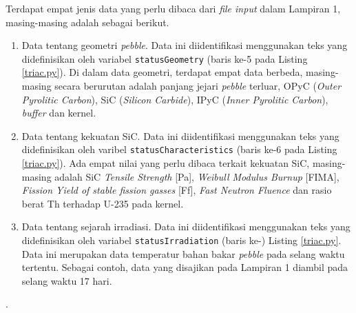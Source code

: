 \documentclass[a4paper,11pt]{report}
\begin{document}
Terdapat empat jenis data yang perlu dibaca dari \textit{file input} dalam Lampiran 1, masing-masing adalah sebagai berikut.
\begin{enumerate}
  \item Data tentang geometri \textit{pebble}. Data ini diidentifikasi menggunakan teks yang didefinisikan oleh variabel \texttt{statusGeometry} (baris ke-5 pada Listing \ref{triac.py}). Di dalam data geometri, terdapat empat data berbeda, masing-masing secara berurutan adalah panjang jejari \textit{pebble} terluar, OPyC (\textit{Outer Pyrolitic Carbon}), SiC (\textit{Silicon Carbide}), IPyC (\textit{Inner Pyrolitic Carbon}), \textit{buffer} dan kernel. 
  \item Data tentang kekuatan SiC. Data ini diidentifikasi menggunakan teks yang didefinisikan oleh varibel \texttt{statusCharacteristics} (baris ke-6 pada Listing \ref{triac.py}). Ada empat nilai yang perlu dibaca terkait kekuatan SiC, masing-masing adalah SiC \textit{Tensile Strength} [Pa],	\textit{Weibull Modulus	Burnup} [FIMA],	\textit{Fission Yield of stable fission gasses} [Ff],	\textit{Fast Neutron Fluence}	dan rasio berat Th terhadap U-235 pada kernel.
    \item Data tentang sejarah irradiasi. Data ini diidentifikasi menggunakan teks yang didefinisikan oleh variabel \texttt{statusIrradiation} (baris ke-) Listing \ref{triac.py}. Data ini merupakan data temperatur bahan bakar \textit{pebble} pada selang waktu tertentu. Sebagai contoh, data yang disajikan pada Lampiran 1 diambil pada selang waktu 17 hari.
\end{enumerate}.
 



\begin{appendix}
	
	\setcounter{page}{2}
	
\end{appendix}
\end{document}
